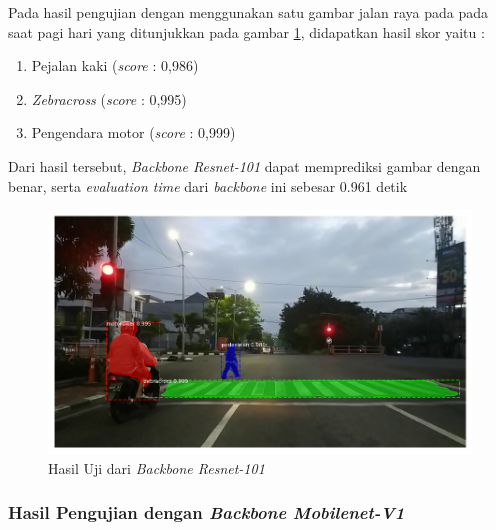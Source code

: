Pada hasil pengujian dengan menggunakan satu gambar jalan raya pada pada saat pagi hari yang ditunjukkan pada gambar \ref{fig:hasil-resnet101}, didapatkan hasil skor yaitu :
\begin{enumerate}[nolistsep]
	\item Pejalan kaki (\textit{score} : 0,986)
	\item \textit{Zebracross} (\textit{score} : 0,995)
	\item Pengendara motor (\textit{score} : 0,999)
\end{enumerate}
Dari hasil tersebut, \textit{Backbone Resnet-101} dapat memprediksi gambar dengan benar, serta \textit{evaluation time} dari \textit{backbone} ini sebesar 0.961 detik
\begin{figure}[h] 
	\centering
	\includegraphics[scale=0.3]{gambar/fajar-frame800-resnet101.png}
	\caption{Hasil Uji dari \textit{Backbone Resnet-101}}
	\label{fig:hasil-resnet101}
\end{figure}

\subsubsection{Hasil Pengujian dengan \textit{Backbone Mobilenet-V1}}

